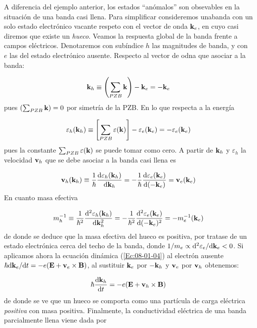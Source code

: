 A diferencia del ejemplo anterior, los estados ``anómalos'' son obsevables en la situación de una banda casi llena. Para simplificar consideremos unabanda con un solo estado electrónico vacante respeto con el vector de onda $\mathbf{k}_e$, en cuyo casi diremos que existe un \textit{hueco}. Veamos la respuesta global de la banda frente a campos eléctricos. Denotaremos con subíndice $h$ las magnitudes de banda, y con $e$ las del estado electrónico ausente. Respecto al vector de odna que asociar a la banda:

\begin{equation}
	\mathbf{k}_h \equiv \left( \sum_{PZB} \mathbf{k} \right) - \mathbf{k}_e = - \mathbf{k}_e
\end{equation}
pues $\left( \sum_{PZB} \mathbf{k} \right) =0$ por simetría de la PZB. En lo que respecta a la energía 

\begin{equation}
	\varepsilon_h (\mathbf{k}_h) \equiv \left[ \sum_{PZB} \varepsilon(\mathbf{k})  \right] - \varepsilon_e (\mathbf{k}_e) = - \varepsilon_e (\mathbf{k}_e)
\end{equation}
pues la constante $\sum_{PZB} \varepsilon(\mathbf{k})$ se puede tomar como cero. A partir de $\mathbf{k}_h$ y $\varepsilon_h$ la velocidad $\mathbf{v}_h$ que se debe asociar a la banda casi llena es 
 
\begin{equation}
	\mathbf{v}_h (\mathbf{k}_h) \equiv \frac{1}{\hbar} \frac{\mathrm{d} \varepsilon_h (\mathbf{k}_h)}{\mathrm{d} \mathbf{k}_h} = - \frac{1}{\hbar} \frac{\mathrm{d} \varepsilon_e (\mathbf{k}_e)}{\mathrm{d} (-\mathbf{k}_e)} = \mathbf{v}_e (\mathbf{k}_e)
\end{equation}
En cuanto masa efectiva

\begin{equation}
	m_h^{-1} \equiv \frac{1}{\hbar^2} \frac{\mathrm{d} ^2\varepsilon_h (\mathbf{k}_h)}{\mathrm{d} \mathbf{k}_h^2} = - \frac{1}{\hbar^2} \frac{\mathrm{d} ^2\varepsilon_e (\mathbf{k}_e)}{\mathrm{d} (-\mathbf{k}_e)^2} = - m_e^{-1}(\mathbf{k}_e)
\end{equation}
de donde se deduce que la masa efectiva del hueco es positiva, por tratase de un estado electrónica cerca del techo de la banda, donde $1/m_e \propto \mathrm{d}^2 \varepsilon_e / \mathrm{d} \mathbf{k}_e <0$. Si aplicamos ahora la ecuación dinámica (\ref{Ec:08-01-04}) al electrón ausente $\hbar \mathrm{d} \mathbf{k}_e / \mathrm{d} t = - e (\mathbf{E} + \mathbf{v}_e \times \mathbf{B})$, al sustituir $\mathbf{k}_e$ por $-\mathbf{k}_h$ y $\mathbf{v}_e$ por $\mathbf{v}_h$ obtenemos:

\begin{equation}
	\hbar \frac{\mathrm{d} \mathbf{k}_h}{\mathrm{d} t} = - e (\mathbf{E} + \mathbf{v}_h \times \mathbf{B})
\end{equation}
de donde se ve que un hueco se comporta como una partícula de carga eléctrica \textit{positiva} con masa positiva. Finalmente, la conductividad eléctrica de una banda parcialmente llena viene dada por


